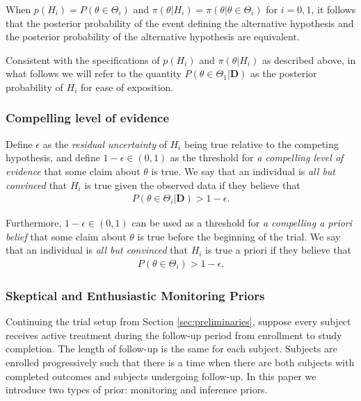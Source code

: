 \documentclass[12pt]{article}
\begin{document}
When $p(H_i) =P(\theta\in\Theta_i)$ and 
$\pi\left(\theta \big| H_i\right) = \pi\left(\theta\big|\theta \in \Theta_i\right)$ for $i=0,1$,
it follows that the posterior probability of the event defining the alternative hypothesis and the posterior
probability of the alternative hypothesis are equivalent. 

Consistent with the specifications of $p(H_i)$ and $\pi\left(\theta \big| H_i\right)$ as described above, in what follows we will refer to 
the quantity $P(\theta\in\Theta_1|\mathbf{D})$ as the posterior probability of $H_i$ for ease of exposition.

\subsubsection{Compelling level of evidence}
Define $\epsilon$ as the \textit{residual uncertainty} of $H_i$ being true relative to the competing hypothesis, and define $1-\epsilon\in(0,1)$ as the threshold for \textit{a compelling level of evidence} that some claim about $\theta$ is true. We say that an individual is \textit{all but convinced} that $H_i$ is true given the observed data if they believe that
\begin{align}\label{eq:compellingevidence}
P(\theta\in\Theta_i|\mathbf{D})> 1-\epsilon.
\end{align} 

Furthermore, $1-\epsilon\in(0,1)$ can be used as a threshold for \textit{a compelling a priori belief} that some claim about $\theta$ is true before the beginning of the trial. We say that an individual is \textit{all but convinced} that $H_i$ is true a priori if they believe that
\begin{align}\label{eq:compellingapriori}
P(\theta\in\Theta_i)>1-\epsilon.
\end{align} 

\subsubsection{Skeptical and Enthusiastic Monitoring Priors}\label{sec:MP}
Continuing the trial setup from Section \ref{sec:preliminaries}, suppose every subject receives active treatment during the follow-up period from enrollment to study completion. The length of follow-up is the same for each subject. Subjects are enrolled progressively such that there is a time when there are both subjects with completed outcomes and subjects undergoing follow-up. In this paper we introduce two types of prior: monitoring and inference priors. 
\end{document}
